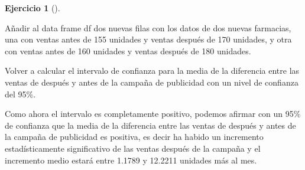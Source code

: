 \documentclass[
  a4paper,
]{scrreport}
\newenvironment{Shaded}{\begin{snugshade}}{\end{snugshade}}
\newcommand{\ExtensionTok}[1]{\textcolor[rgb]{0.00,0.23,0.31}{#1}}
\newcommand{\NormalTok}[1]{\textcolor[rgb]{0.00,0.23,0.31}{#1}}
\theoremstyle{definition}
\newtheorem{exercise}{Ejercicio}[chapter]
\theoremstyle{remark}
\begin{document}
\begin{exercise}[]
\begin{enumerate}
\begin{tcolorbox}
\begin{Shaded}
\begin{Highlighting}[]
\ExtensionTok{Añadir}\NormalTok{ al data frame df dos nuevas filas con los datos de dos nuevas farmacias, una con ventas antes de 155 unidades y ventas después de 170 unidades, y otra con ventas antes de 160 unidades y ventas después de 180 unidades.}

\ExtensionTok{Volver}\NormalTok{ a calcular el intervalo de confianza para la media de la diferencia entre las ventas de después y antes de la campaña de publicidad con un nivel de confianza del 95\%.}
\end{Highlighting}
\end{Shaded}

  Como ahora el intervalo es completamente positivo, podemos afirmar con
  un 95\% de confianza que la media de la diferencia entre las ventas de
  después y antes de la campaña de publicidad es positiva, es decir ha
  habido un incremento estadísticamente significativo de las ventas
  después de la campaña y el incremento medio estará entre 1.1789 y
  12.2211 unidades más al mes.

  \end{tcolorbox}
\end{enumerate}

\end{exercise}
\end{document}
